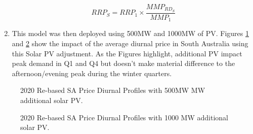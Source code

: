 \begin{enumerate}
        \begin{equation}
        RRP_{S} = RRP_1 \times \dfrac{MMP_{RD_S}}{MMP_1}
    \end{equation}
    \item This model was then deployed using 500MW and 1000MW of PV. Figures \ref{fig:bess_w_low_solar} and \ref{fig:bess_w_high_solar} show the impact of the average diurnal price in South Australia using this Solar PV adjustment. As the Figures highlight, additional PV impact peak demand in Q1 and Q4 but doesn't make material difference to the afternoon/evening peak during the winter quarters.  
\end{enumerate}
\begin{figure}[H]
    \centering
    \caption{2020 Re-based SA Price Diurnal Profiles with 500MW MW additional solar PV.}
    \label{fig:bess_w_low_solar}
\end{figure}
\begin{figure}[H]
    \centering
    \caption{2020 Re-based SA Price Diurnal Profiles with 1000 MW additional solar PV.}
    \label{fig:bess_w_high_solar}
\end{figure}
